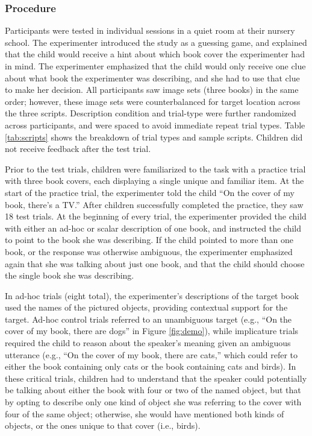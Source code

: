 \documentclass[man]{apa2}
\begin{document}
\subsubsection{Procedure}

Participants were tested in individual sessions in a quiet room at their nursery school. The experimenter introduced the study as a guessing game, and explained that the child would receive a hint about which book cover the experimenter had in mind. The experimenter emphasized that the child would only receive one clue about what book the experimenter was describing, and she had to use that clue to make her decision. All participants saw image sets (three books) in the same order; however, these image sets were counterbalanced for target location across the three scripts. Description condition and trial-type were further randomized across participants, and were spaced to avoid immediate repeat trial types. Table \ref{tab:scripts} shows the breakdown of trial types and sample scripts. Children did not receive feedback after the test trial.

Prior to the test trials, children were familiarized to the task with a practice trial with three book covers, each displaying a single unique and familiar item. At the start of the practice trial, the experimenter told the child ``On the cover of my book, there's a TV.'' After children successfully completed the practice, they saw 18 test trials. At the beginning of every trial, the experimenter provided the child with either an ad-hoc or scalar description of one book, and instructed the child to point to the book she was describing. If the child pointed to more than one book, or the response was otherwise ambiguous, the experimenter emphasized again that she was talking about just one book, and that the child should choose the single book she was describing.

In ad-hoc trials (eight total), the experimenter's descriptions of the target book used the names of the pictured objects, providing contextual support for the target. Ad-hoc control trials referred to an unambiguous target (e.g., ``On the cover of my book, there are dogs'' in Figure \ref{fig:demo}), while implicature trials required the child to reason about the speaker's meaning given an ambiguous utterance (e.g., ``On the cover of my book, there are cats,'' which could refer to either the book containing only cats or the book containing cats and birds). In these critical trials, children had to understand that the speaker could potentially be talking about either the book with four or two of the named object, but that by opting to describe only one kind of object she was referring to the cover with four of the same object; otherwise, she would have mentioned both kinds of objects, or the ones unique to that cover (i.e., birds).
\end{document}
